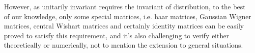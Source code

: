 \documentclass[10pt,journal,compsoc]{IEEEtran}
\begin{document}
However, as unitarily invariant requires the invariant of distribution, to the best of our knowledge, only some special matrices, i.e. haar matrices, Gaussian Wigner matrices, central Wishart matrices and certainly identity matrices can be easily proved to satisfy this requirement, and it's also challenging to verify either theoretically or numerically, not to mention the extension to general situations.
  \begin{comment}
\section{Detailed setup of experiments}
\subsection{Numerical experiment of Fig. \ref{fig:num3_1}. }\label{setup:num3_1}

We use an 8-layer MLP with ReLU on MNIST. Batch size is chosen as 128, and $E\left[\frac{||\mathbf{f}(\mathbf{x})||_2^2}{len(\mathbf{f}(\mathbf{x}))}\right]$ is calculated by averaging $\frac{||\mathbf{f}(\mathbf{x})||_2^2}{len(\mathbf{f}(\mathbf{x}))}$ of all samples within the batch. The control of $\phi(\mathbf{JJ}^T)$ is achieved by initializing the weight with $N(0, \frac{2s}{n})$, where $s$ is a scaling factor while $n$ denotes the input feature map size.
\end{comment} 
\end{document}
